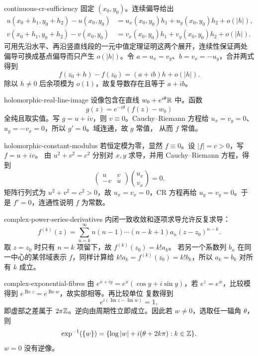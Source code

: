 \begin{solution}{continuous-cr-sufficiency}
固定 \((x_0,y_0)\)。连续偏导给出
\[
 \begin{aligned}
 u(x_0+h_1,y_0+h_2)-u(x_0,y_0)
 &=u_x(x_0,y_0)h_1+u_y(x_0,y_0)h_2+o(|h|),\\
 v(x_0+h_1,y_0+h_2)-v(x_0,y_0)
 &=v_x(x_0,y_0)h_1+v_y(x_0,y_0)h_2+o(|h|).
 \end{aligned}
\]
可用先沿水平、再沿竖直线段的一元中值定理证明这两个展开，连续性保证两处
偏导可换成基点偏导而只产生 \(o(|h|)\)。令
\(a=u_x=v_y\)、\(b=v_x=-u_y\)，合并两式得到
\[
 f(z_0+h)-f(z_0)=(a+ib)h+o(|h|).
\]
除以 \(h\ne0\) 后余项模为 \(o(1)\)，故复导数存在且等于 \(a+ib\)。
\end{solution}

\begin{solution}{holomorphic-real-line-image}
设像包含在直线 \(w_0+e^{i\theta}\mathbb{R}\) 中。函数
\[
 g(z)=e^{-i\theta}(f(z)-w_0)
\]
全纯且取实值。写 \(g=u+iv\)，则 \(v\equiv0\)。Cauchy--Riemann 方程给
\(u_x=v_y=0\)、\(u_y=-v_x=0\)，所以 \(g'=0\)。域连通，故 \(g\) 常值，
从而 \(f\) 常值。
\end{solution}

\begin{solution}{holomorphic-constant-modulus}
若恒定模为零，显然 \(f\equiv0\)。设 \(|f|=c>0\)，写 \(f=u+iv\)。
由 \(u^2+v^2=c^2\) 分别对 \(x,y\) 求导，并用 Cauchy--Riemann 方程，得到
\[
 \begin{pmatrix}u&v\\-v&u\end{pmatrix}
 \binom{u_x}{v_x}=0.
\]
矩阵行列式为 \(u^2+v^2=c^2>0\)，故 \(u_x=v_x=0\)，CR 方程再给
\(u_y=v_y=0\)。于是 \(f'=0\)，连通性说明 \(f\) 为常数。
\end{solution}

\begin{solution}{complex-power-series-derivatives}
内闭一致收敛和逐项求导允许反复求导：
\[
 f^{(k)}(z)=
 \sum_{n=k}^{\infty}n(n-1)\cdots(n-k+1)a_n(z-z_0)^{n-k}.
\]
取 \(z=z_0\) 时只有 \(n=k\) 项留下，故 \(f^{(k)}(z_0)=k!a_k\)。
若另一个系数列 \(b_n\) 在同一中心的某邻域表示 \(f\)，同样计算给
\(k!a_k=f^{(k)}(z_0)=k!b_k\)，所以 \(a_k=b_k\) 对所有 \(k\) 成立。
\end{solution}

\begin{solution}{complex-exponential-fibres}
由 \(e^{x+iy}=e^x(\cos y+i\sin y)\)，若 \(e^z=e^w\)，比较模得到
\(e^{\operatorname{Re}z}=e^{\operatorname{Re}w}\)，故实部相等。再比较单位
复数得到
\[
 e^{i(\operatorname{Im}z-\operatorname{Im}w)}=1,
\]
即虚部之差属于 \(2\pi\mathbb{Z}\)。逆向由周期性立即成立。因此若
\(w\ne0\)，选取任一辐角 \(\theta\)，则
\[
 \exp^{-1}(\{w\})
 =\{\log|w|+i(\theta+2k\pi):k\in\mathbb{Z}\}.
\]
\(w=0\) 没有逆像。
\end{solution}

